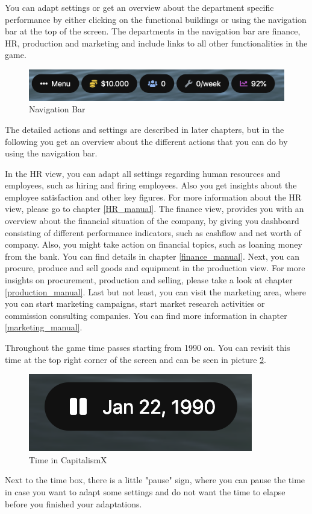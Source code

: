 \documentclass[11pt,titlepage,oneside,openany]{book}
\begin{document}
You can adapt settings or get an overview about the department specific performance by either clicking on the functional buildings or using the navigation bar at the top of the screen. The departments in the navigation bar are finance, HR, production and marketing and include links to all other functionalities in the game. 
\begin{figure} [!htbp]
    \centering
    \includegraphics [width=\textwidth]{images/navigationBar.png}
    \caption{Navigation Bar}
    \label{fig:navigationBar}
\end{figure} The detailed actions and settings are described in later chapters, but in the following you get an overview about the different actions that you can do by using the navigation bar.

In the HR view, you can adapt all settings regarding human resources and employees, such as hiring and firing employees. Also you get insights about the employee satisfaction and other key figures. For more information about the HR view, please go to chapter \ref{HR_manual}.
The finance view, provides you with an overview about the financial situation of the company, by giving you dashboard consisting of different performance indicators, such as cashflow and net worth of company. Also, you might take action on financial topics, such as loaning money from the bank. You can find details in chapter \ref{finance_manual}.
Next, you can procure, produce and sell goods and equipment in the production view. For more insights on procurement, production and selling, please take a look at chapter \ref{production_manual}. 
Last but not least, you can visit the marketing area, where you can start marketing campaigns, start market research activities or commission consulting companies. You can find more information in chapter \ref{marketing_manual}.

Throughout the game time passes starting from 1990 on. You can revisit this time at the top right corner of the screen and can be seen in picture \ref{fig:time}.
\begin{figure} [!htbp]
    \centering
    \includegraphics{images/time.png}
    \caption{Time in CapitalismX}
    \label{fig:time}
\end{figure}
Next to the time box, there is a little "pause" sign, where you can pause the time in case you want to adapt some settings and do not want the time to elapse before you finished your adaptations.
\end{document}
